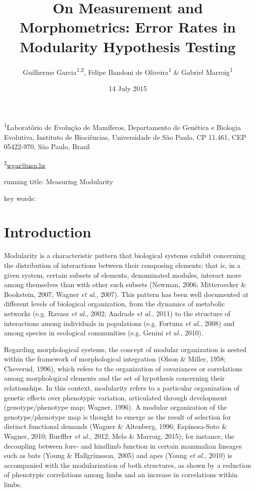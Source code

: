 \documentclass[12pt,]{article}
\title{On Measurement and Morphometrics: Error Rates in Modularity Hypothesis
Testing}
\author{Guilherme Garcia\textsuperscript{1,2}, Felipe Bandoni de
Oliveira\textsuperscript{1} \& Gabriel Marroig\textsuperscript{1}}
\date{14 July 2015}
\begin{document}
\maketitle


\linenumbers
\modulolinenumbers[2]

\onehalfspacing

\textsuperscript{1}Laboratório de Evolução de Mamíferos, Departamento de
Genética e Biologia Evolutiva, Instituto de Biociências, Universidade de
São Paulo, CP 11.461, CEP 05422-970, São Paulo, Brasil

\textsuperscript{2}\href{mailto:wgar@usp.br}{wgar@usp.br}

running title: Measuring Modularity

key words:

\section{Introduction}\label{introduction}

Modularity is a characteristic pattern that biological systems exhibit
concerning the distribution of interactions between their composing
elements; that is, in a given system, certain subsets of elements,
denominated modules, interact more among themselves than with other such
subsets (Newman, 2006; Mitteroecker \& Bookstein, 2007; Wagner \emph{et
al.}, 2007). This pattern has been well documented at different levels
of biological organization, from the dynamics of metabolic networks
(e.g. Ravasz \emph{et al.}, 2002; Andrade \emph{et al.}, 2011) to the
structure of interactions among individuals in populations (e.g. Fortuna
\emph{et al.}, 2008) and among species in ecological communities (e.g.
Genini \emph{et al.}, 2010).

Regarding morphological systems, the concept of modular organization is
nested within the framework of morphological integration (Olson \&
Miller, 1958; Cheverud, 1996), which refers to the organization of
covariances or correlations among morphological elements and the set of
hypothesis concerning their relationships. In this context, modularity
refers to a particular organization of genetic effects over phenotypic
variation, articulated through development (genotype/phenotype map;
Wagner, 1996). A modular organization of the genotype/phenotype map is
thought to emerge as the result of selection for distinct functional
demands (Wagner \& Altenberg, 1996; Espinosa-Soto \& Wagner, 2010;
Rueffler \emph{et al.}, 2012; Melo \& Marroig, 2015); for instance, the
decoupling between fore- and hindlimb function in certain mammalian
lineages such as bats (Young \& Hallgrímsson, 2005) and apes (Young
\emph{et al.}, 2010) is accompanied with the modularization of both
structures, as shown by a reduction of phenotypic correlations among
limbs and an increase in correlations within limbs.
\end{document}
